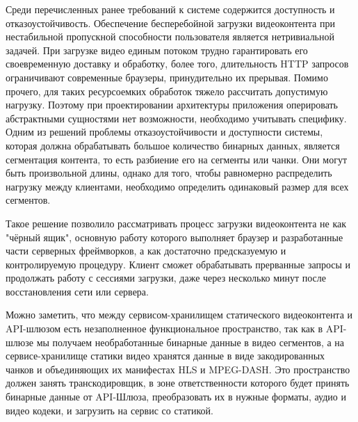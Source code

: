 	 Среди перечисленных ранее требований к системе содержится доступность и отказоустойчивость. Обеспечение бесперебойной загрузки видеоконтента при нестабильной пропускной способности пользователя является нетривиальной задачей. При загрузке видео единым потоком трудно гарантировать его своевременную доставку и обработку, более того, длительность HTTP запросов ограничивают современные браузеры, принудительно их прерывая. Помимо прочего, для таких ресурсоемких обработок тяжело рассчитать допустимую нагрузку. Поэтому при проектировании архитектуры приложения оперировать абстрактными сущностями нет возможности, необходимо учитывать специфику. Одним из решений проблемы отказоустойчивости и доступности системы, которая должна обрабатывать большое количество бинарных данных, является сегментация контента, то есть разбиение его на сегменты или чанки. Они могут быть произвольной длины, однако для того, чтобы равномерно распределить нагрузку между клиентами, необходимо определить одинаковый размер для всех сегментов.

	Такое решение позволило рассматривать процесс загрузки видеоконтента не как "чёрный ящик", основную работу которого выполняет браузер и разработанные части серверных фреймворков, а как достаточно предсказуемую и контролируемую процедуру. Клиент сможет обрабатывать прерванные запросы и продолжать работу с сессиями загрузки, даже через несколько минут после восстановления сети или сервера.

	Можно заметить, что между сервисом-хранилищем статического видеоконтента и API-шлюзом есть незаполненное функциональное пространство, так как в API-шлюзе мы получаем необработанные бинарные данные в видео сегментов, а на сервисе-хранилище статики видео хранятся данные в виде закодированных чанков и объединяющих их манифестах HLS и MPEG-DASH. Это пространство должен занять транскодировщик, в зоне ответственности которого будет принять бинарные данные от API-Шлюза, преобразовать их в нужные форматы, аудио и видео кодеки, и загрузить на сервис со статикой.

